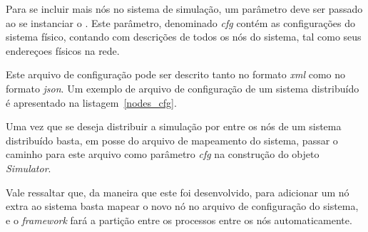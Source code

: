 Para se incluir mais nós no sistema de simulação, um parâmetro deve ser passado ao se instanciar o . Este parâmetro, denominado \textit{cfg} contém as configurações do sistema físico, contando com descrições de todos os nós do sistema, tal como seus endereçoes físicos na rede. 

Este arquivo de configuração pode ser descrito tanto no formato \textit{xml} como no formato \textit{json}. Um exemplo de arquivo de configuração de um sistema distribuído é apresentado na listagem~\ref{nodes_cfg}.



Uma vez que se deseja distribuir a simulação por entre os nós de um sistema distribuído basta, em posse do arquivo de mapeamento do sistema, passar o caminho para este arquivo como parâmetro \textit{cfg} na construção do objeto \textit{Simulator}.

Vale ressaltar que, da maneira que este  foi desenvolvido, para adicionar um nó extra ao sistema basta mapear o novo nó no arquivo de configuração do sistema, e o \textit{framework} fará a partição entre os processos entre os nós automaticamente. 



